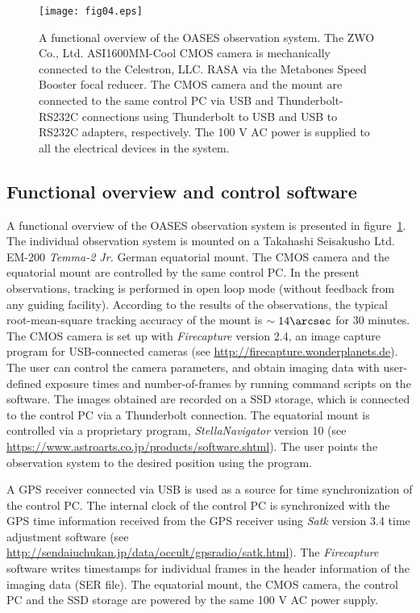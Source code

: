 \documentclass{pasj01}
\newcommand{\void}[1]{}
\renewcommand{\textcolor}{\void}
\begin{document}
\begin{figure}[!t]
\begin{center}
   \texttt{[image: fig04.eps]}
   \caption{A functional overview of the OASES observation system. 
   The ZWO Co., Ltd. ASI1600MM-Cool CMOS camera is mechanically connected to the Celestron, LLC. RASA via the Metabones Speed Booster focal reducer.
   The CMOS camera and the mount are connected to the same control PC via USB and 
   Thunderbolt-RS232C connections using Thunderbolt to USB and USB to RS232C adapters, respectively.
   The 100 V AC power is supplied to all the electrical devices in the system.}
   \label{fig33}
 \end{center}
\end{figure}

\subsection{Functional overview and control software}
A functional overview of the OASES observation system is presented in
figure~\ref{fig33}.
The individual observation system is mounted on a Takahashi Seisakusho Ltd. EM-200 {\it Temma-2 Jr.} 
German equatorial mount.
The CMOS camera and the equatorial mount are controlled by the same control PC.
\textcolor{red}{
In the present observations, tracking is performed in open loop mode
(without feedback from any guiding facility).
According to the results of the observations, 
the typical root-mean-square tracking accuracy of the mount is $\sim 14\arcsec $ for 30 minutes.
}
The CMOS camera is set up with
{\it Firecapture} version 2.4, an image capture program for USB-connected cameras 
(see \url{http://firecapture.wonderplanets.de}).
The user can control the camera parameters,
and obtain imaging data with user-defined exposure times and 
number-of-frames 
by running command scripts on the software.
The images obtained are recorded on a SSD storage,
which is connected to the control PC via a Thunderbolt connection.
The equatorial mount is 
controlled via a proprietary program, 
{\it StellaNavigator} version 10
(see \url{https://www.astroarts.co.jp/products/software.shtml}).
The user points the observation system to the desired position using the program.

A GPS receiver connected via USB is used as a source for time synchronization of the control PC.
The internal clock of the control PC is synchronized 
with the GPS time information received from the GPS receiver
using {\it Satk} version 3.4 time adjustment software
(see \url{http://sendaiuchukan.jp/data/occult/gpsradio/satk.html}).
The {\it Firecapture} software writes timestamps for individual frames in the 
header information of the imaging data (SER file).
The equatorial mount, the CMOS camera, the control PC and the SSD storage 
are powered by the same 100 V AC power supply.  
\end{document}
